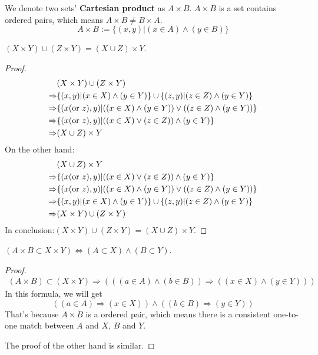 We denote two sets' \textbf{Cartesian product} as $A \times B $.
$A\times B$ is a set contains ordered pairs, which means $A\times B\neq B\times A$.
\[A\times B:=\{(x,y)|(x\in A)\wedge(y\in B)\}\]
\begin{question}
    $(X\times Y)\cup (Z\times Y)=(X\cup Z)\times Y$.
\end{question}
\begin{proof}
    \[\begin{aligned}
        &(X\times Y)\cup (Z\times Y)\\\Rightarrow&\{(x,y)|(x\in X)\wedge(y\in Y)\}\cup \{(z,y)|(z\in Z)\wedge(y\in Y)\}\\\Rightarrow&\{(x ({\rm or}\ z),y)|((x\in X)\wedge(y\in Y))\vee((z\in Z)\wedge(y\in Y))\}\\\Rightarrow&\{(x ({\rm or}\ z),y)|((x\in X)\vee (z\in Z))\wedge(y\in Y)\}\\\Rightarrow&(X\cup Z)\times Y
    \end{aligned}\]
    On the other hand:
    \[\begin{aligned}
        &(X\cup Z)\times Y\\\Rightarrow&\{(x ({\rm or}\ z),y)|((x\in X)\vee (z\in Z))\wedge(y\in Y)\}\\\Rightarrow&\{(x ({\rm or}\ z),y)|((x\in X)\wedge(y\in Y))\vee((z\in Z)\wedge(y\in Y))\}\\\Rightarrow&\{(x,y)|(x\in X)\wedge(y\in Y)\}\cup \{(z,y)|(z\in Z)\wedge(y\in Y)\}\\\Rightarrow&(X\times Y)\cup (Z\times Y)
    \end{aligned}\]
    In conclusion:$(X\times Y)\cup (Z\times Y)=(X\cup Z)\times Y$.
\end{proof}
\begin{question}
    $(A\times B\subset X\times Y)\Leftrightarrow(A\subset X)\wedge(B\subset Y)$.
\end{question}
\begin{proof}
    \[\begin{aligned}
        (A\times B)\subset (X\times Y)\Rightarrow(((a\in A)\wedge(b\in B))\Rightarrow((x\in X)\wedge(y\in Y)))
    \end{aligned}\]
    In this formula, we will get \[((a\in A)\Rightarrow(x\in X))\wedge((b\in B)\Rightarrow(y\in Y))\] That's because $A\times B$ is a ordered pair, which means there is a consistent one-to-one match between $A$ and $X$, $B$ and $Y$.
    
    The proof of the other hand is similar.
\end{proof}
